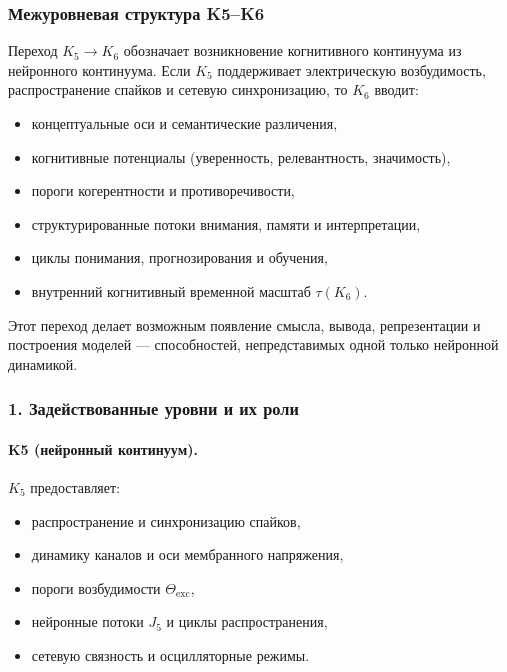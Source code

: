 
\subsubsection{Межуровневая структура K5–K6}
\label{sec:crossk-k5-k6}

Переход $K_5 \rightarrow K_6$ обозначает возникновение когнитивного
континуума из нейронного континуума. Если $K_5$ поддерживает электрическую
возбудимость, распространение спайков и сетевую синхронизацию, то $K_6$
вводит:
\begin{itemize}
  \item концептуальные оси и семантические различения,
  \item когнитивные потенциалы (уверенность, релевантность, значимость),
  \item пороги когерентности и противоречивости,
  \item структурированные потоки внимания, памяти и интерпретации,
  \item циклы понимания, прогнозирования и обучения,
  \item внутренний когнитивный временной масштаб $\tau(K_6)$.
\end{itemize}

Этот переход делает возможным появление смысла, вывода, репрезентации и
построения моделей — способностей, непредставимых одной только нейронной
динамикой.

\subsubsection{1. Задействованные уровни и их роли}

\paragraph{K5 (нейронный континуум).}
$K_5$ предоставляет:
\begin{itemize}
  \item распространение и синхронизацию спайков,
  \item динамику каналов и оси мембранного напряжения,
  \item пороги возбудимости $\Theta_{\mathrm{exc}}$,
  \item нейронные потоки $J_5$ и циклы распространения,
  \item сетевую связность и осцилляторные режимы.
\end{itemize}

